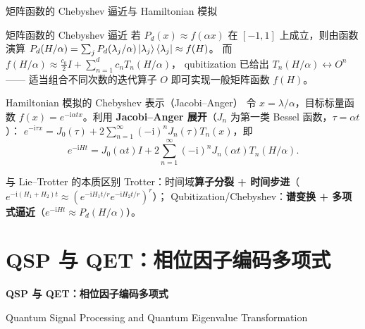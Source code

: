 \documentclass[aspectratio=169,9pt]{ctexbeamer}
\newcommand{\ii}{\mathrm{i}}
\newcommand{\smallcite}[1]{\par\vspace{1.2mm}{\scriptsize\color{graytext}#1}}
\begin{document}
\begin{frame}{矩阵函数的 Chebyshev 逼近与 Hamiltonian 模拟}
\begin{keybox}{矩阵函数的 Chebyshev 逼近}
若 $P_d(x)\approx f(\alpha x)$ 在 $[-1,1]$ 上成立，则由函数演算
$P_d(H/\alpha)=\sum_jP_d(\lambda_j/\alpha)\ket{\lambda_j}\bra{\lambda_j}\approx f(H)$。
而 $f(H/\alpha)\approx\frac{c_0}{2}I+\sum_{n=1}^{d}c_nT_n(H/\alpha)$，
qubitization 已给出 $T_n(H/\alpha)\leftrightarrow O^n$ —— 适当组合不同次数的迭代算子
$O$ 即可实现一般矩阵函数 $f(H)$。
\end{keybox}
\begin{keybox}{Hamiltonian 模拟的 Chebyshev 表示（Jacobi--Anger）}
令 $x=\lambda/\alpha$，目标标量函数 $f(x)=e^{-\ii\alpha tx}$。利用
\textbf{Jacobi--Anger 展开}（$J_n$ 为第一类 Bessel 函数，$\tau=\alpha t$）：
$e^{-\ii\tau x}=J_0(\tau)+2\sum_{n=1}^{\infty}(-\ii)^nJ_n(\tau)T_n(x)$，即
\[
e^{-\ii Ht}=J_0(\alpha t)I+2\sum_{n=1}^{\infty}(-\ii)^nJ_n(\alpha t)T_n(H/\alpha).
\]
\end{keybox}
\begin{warnbox}{与 Lie--Trotter 的本质区别}
Trotter：时间域\textbf{算子分裂 + 时间步进}（$e^{-\ii(H_1+H_2)t}\approx(e^{-\ii H_1t/r}e^{-\ii H_2t/r})^r$）；
Qubitization/Chebyshev：\textbf{谱变换 + 多项式逼近}（$e^{-\ii Ht}\approx P_d(H/\alpha)$）。
\end{warnbox}
\smallcite{Model 3 笔记第 5.9 节。}
\end{frame}

\section{QSP 与 QET：相位因子编码多项式}
\begin{frame}[plain]
\centering\vspace{2.0cm}
{\Huge\bfseries\color{navy} QSP 与 QET：相位因子编码多项式}\par\vspace{4mm}
{\large Quantum Signal Processing and Quantum Eigenvalue Transformation}
\end{frame}
\end{document}
